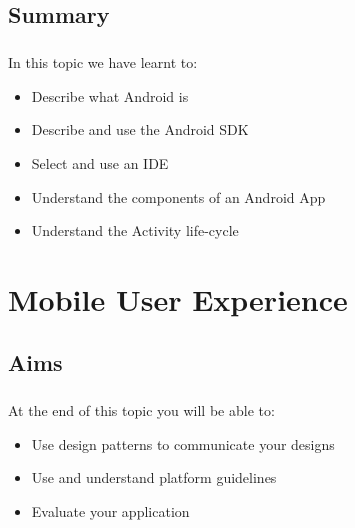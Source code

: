 \documentclass[12pt, a4paper, twoside]{book}
\begin{document}
\section{Summary}
\paragraph{} In this topic we have learnt to:

\begin{itemize}
\item Describe what Android is
\item Describe and use the Android SDK
\item Select and use an IDE
\item Understand the components of an Android App
\item Understand the Activity life-cycle
\end{itemize}




\chapter{Mobile User Experience}

\section{Aims}
\paragraph{} At the end of this topic you will be able to:

\begin{itemize}
\item Use design patterns to communicate your designs
\item Use and understand platform guidelines
\item Evaluate your application
\end{itemize}
\end{document}
